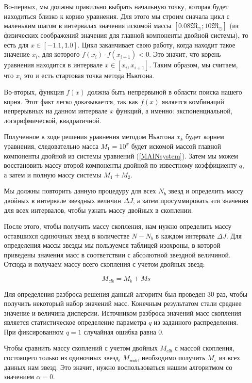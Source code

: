 \documentclass[a4paper,12pt]{article}
\begin{document}
Во-первых, мы должны правильно выбрать начальную точку, которая будет находиться близко к корню уравнения. Для этого мы строим сначала цикл с маленьким шагом в интервалах значения искомой массы $[0.08 \mathfrak{M}_{\odot};10 \mathfrak{M}_{\odot}]$ (из физических соображений значения для главной компоненты двойной системы), то есть для $x \in [-1.1,1.0]$. Цикл заканчивает свою работу, когда находит такое значение $x_i$, для которого $f(x_i)\cdot f(x_{i+1}) <0$. Это значит, что корень уравнения находится в интервале $x \in [x_i,x_{i+1}]$. Таким образом, мы считаем, что $x_i$ это и есть стартовая точка метода Ньютона.

Во-вторых, функция $f(x)$ должна быть непрервыной в области поиска нашего корня. Этот факт легко доказывается, так как $f(x)$ является комбинаций непрерывных на данном интервале $x$ функций, а именно: экспоненциальной, логарифмической, квадратичной.

Полученное в ходе решения уравнения методом Ньютона $x_k$ будет корнем уравнения, следовательно масса $M_1=10^x$ будет искомой массой главной компоненты двойной из системы уравнений (\ref{MAINsystem}).
Затем мы можем восстановить массу второй компоненты двойной по известному коэффициенту $q$, а затем и полную массу системы $M_1+M_2$.

Мы должны повторить данную процедуру для всех $N_{b}$  звезд и определить массу двойных в интервале звездных величин $\Delta J$, а затем просуммировать эти значения для всех интервалов, чтобы узнать массу двойных в скоплении.

После этого, чтобы получить массу скопления, нам нужно определить массу оставшихся одиночных звезд в количестве $N-N_{b}$ в каждом интервале $\Delta J$. Для определения массы звезды мы пользуемся таблицей изохроны, в которой приведены значения масс в соответствии с абсолютной звездной величиной. Отсюда и получаем массу всего скопления с учетом двойных звезд:

\begin{equation}
M_{clb} = M_{b}+M{s}
\end{equation}

Для определения разброса решения данный алгоритм был проведен 30 раз, чтобы получить некоторый набор значений масс. Конечным результатом стали среднее значение и величина дисперсии. Источником разброса значений масс скопления является статистическое определение параметра $q$ из заданного распределения. При фиксированном $q=1$ случайная ошибка равна 0.

Чтобы сравнить массу скоплений с учетом двойных $M_{clb}$ с массой скопления, состоящего только из одиночных звезд, $M_{wob}$, необходимо получить $M_{s}$ из всех данных нам звезд. Это значит, нужно воспользоваться нашим алгоритмом со значением $\alpha = 0$.
\end{document}
